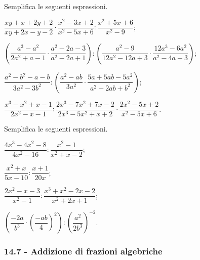 \begin{esercizio}[\Ast]
\label{ese:14.19}
Semplifica le seguenti espressioni.
\begin{enumeratea}
 \item $\dfrac{xy+x+2y+2}{xy+2x-y-2}\cdot\dfrac{x^{2}-3x+2}{x^{2}-5x+6}:\dfrac{x^{2}+5x+6}{x^{2}-9}$;
 \item $\left(\dfrac{a^{3}-a^{2}}{2a^{2}+a-1}\cdot\dfrac{a^{2}-2a-3}{a^{2}-2a+1}\right):\left(\dfrac{a^{2}-9}{12a^{2}-12a+3}\cdot\dfrac{12a^{3}-6a^{2}}{a^{2}-4a+3}\right)$;
 \item $\dfrac{a^{2}-b^{2}-a-b}{3a^{2}-3b^{2}}:\left(\dfrac{a^{2}-ab}{3a^{2}}\cdot\dfrac{5a+5ab-5a^{2}}{a^{2}-2ab+b^{2}}\right)$;
 \item $\dfrac{x^{3}-x^{2}+x-1}{2x^{2}-x-1}:\dfrac{2x^{3}-7x^{2}+7x-2}{2x^{3}-5x^{2}+x+2}\cdot\dfrac{2x^{2}-5x+2}{x^{2}-5x+6}$.%
\end{enumeratea}
\end{esercizio}

\begin{esercizio}
\label{ese:14.20}
Semplifica le seguenti espressioni.
\begin{multicols}{2}
\begin{enumeratea}
 \item $\dfrac{4x^{3}-4x^{2}-8}{4x^{2}-16}:\dfrac{x^{2}-1}{x^{2}+x-2}$;
 \item $\dfrac{x^{2}+x}{5x-10}:\dfrac{x+1}{20x}$;
 \item $\dfrac{2x^{2}-x-3}{x^{2}-1}:\dfrac{x^{3}+x^{2}-2x-2}{x^{2}+2x+1}$;
 \item $\left(\dfrac{-{2a}}{b^{3}}\cdot\left(\dfrac{-{ab}}{4}\right)^{2}\right):\left(\dfrac{a^{2}}{2b^{3}}\right)^{-2}$.%
\end{enumeratea}
\end{multicols}
\end{esercizio}

\subsubsection*{14.7 - Addizione di frazioni algebriche}

